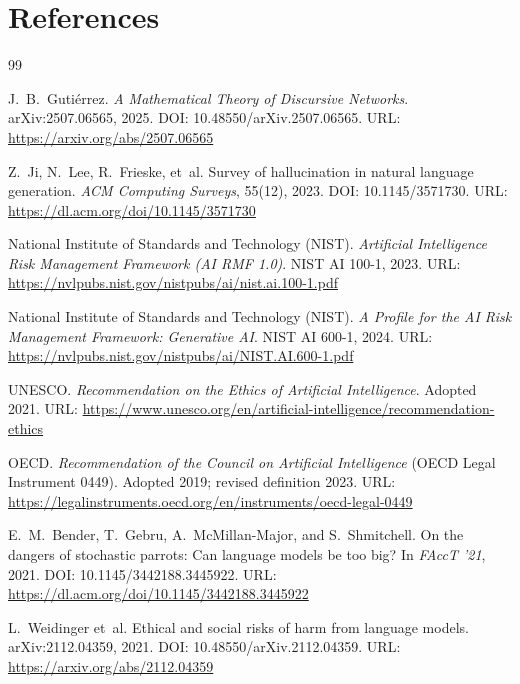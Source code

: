 \documentclass[11pt]{article}
\begin{document}
\section*{References}
\begin{thebibliography}{99}

J.~B.~Guti\'errez.
\newblock \emph{A Mathematical Theory of Discursive Networks}.
\newblock arXiv:2507.06565, 2025.
\newblock DOI: 10.48550/arXiv.2507.06565. URL: \url{https://arxiv.org/abs/2507.06565}

Z.~Ji, N.~Lee, R.~Frieske, et~al.
\newblock Survey of hallucination in natural language generation.
\newblock \emph{ACM Computing Surveys}, 55(12), 2023.
\newblock DOI: 10.1145/3571730. URL: \url{https://dl.acm.org/doi/10.1145/3571730}

National Institute of Standards and Technology (NIST).
\newblock \emph{Artificial Intelligence Risk Management Framework (AI RMF 1.0)}.
\newblock NIST AI 100-1, 2023.
\newblock URL: \url{https://nvlpubs.nist.gov/nistpubs/ai/nist.ai.100-1.pdf}

National Institute of Standards and Technology (NIST).
\newblock \emph{A Profile for the AI Risk Management Framework: Generative AI}.
\newblock NIST AI 600-1, 2024.
\newblock URL: \url{https://nvlpubs.nist.gov/nistpubs/ai/NIST.AI.600-1.pdf}

UNESCO.
\newblock \emph{Recommendation on the Ethics of Artificial Intelligence}.
\newblock Adopted 2021.
\newblock URL: \url{https://www.unesco.org/en/artificial-intelligence/recommendation-ethics}

OECD.
\newblock \emph{Recommendation of the Council on Artificial Intelligence} (OECD Legal Instrument 0449).
\newblock Adopted 2019; revised definition 2023.
\newblock URL: \url{https://legalinstruments.oecd.org/en/instruments/oecd-legal-0449}

E.~M.~Bender, T.~Gebru, A.~McMillan-Major, and S.~Shmitchell.
\newblock On the dangers of stochastic parrots: Can language models be too big?
\newblock In \emph{FAccT '21}, 2021.
\newblock DOI: 10.1145/3442188.3445922. URL: \url{https://dl.acm.org/doi/10.1145/3442188.3445922}

L.~Weidinger et~al.
\newblock Ethical and social risks of harm from language models.
\newblock arXiv:2112.04359, 2021.
\newblock DOI: 10.48550/arXiv.2112.04359. URL: \url{https://arxiv.org/abs/2112.04359}


\end{thebibliography}
\end{document}
